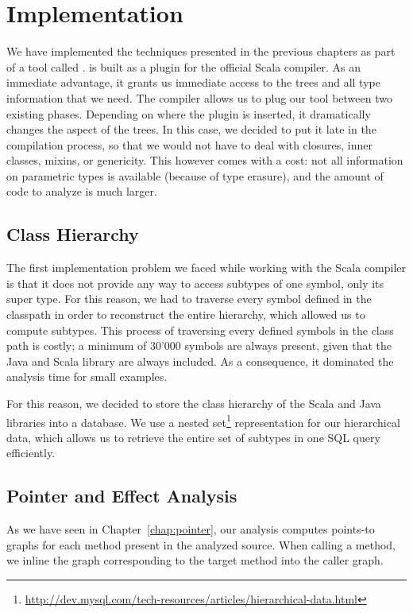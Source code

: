 \chapter{Implementation}
\label{chap:implementation}
We have implemented the techniques presented in the previous chapters as part
of a tool called {\insane}. {\insane} is built as a plugin for the official
Scala compiler. As an immediate advantage, it grants us immediate access to the
trees and all type information that we need. The compiler allows us to plug our
tool between two existing phases. Depending on where the plugin is inserted, it
dramatically changes the aspect of the trees. In this case, we decided to put
it late in the compilation process, so that we would not have to deal with
closures, inner classes, mixins, or genericity. This however comes with a cost:
not all information on parametric types is available (because of type erasure),
and the amount of code to analyze is much larger.

\section{Class Hierarchy}
The first implementation problem we faced while working with the Scala compiler
is that it does not provide any way to access subtypes of one symbol, only its
super type. For this reason, we had to traverse every symbol defined in the
classpath in order to reconstruct the entire hierarchy, which allowed us to
compute subtypes. This process of traversing every defined symbols in the class
path is costly; a minimum of 30'000 symbols are always present, given that the
Java and Scala library are always included. As a consequence, it dominated the
analysis time for small examples.

For this reason, we decided to store the class hierarchy of the Scala and Java
libraries into a database. We use a nested
set\footnote{\url{http://dev.mysql.com/tech-resources/articles/hierarchical-data.html}}
representation for our hierarchical data, which allows us to retrieve the entire
set of subtypes in one SQL query efficiently.

\section{Pointer and Effect Analysis}
As we have seen in Chapter~\ref{chap:pointer}, our analysis computes points-to
graphs for each method present in the analyzed source. When calling a method,
we inline the graph corresponding to the target method into the caller graph.

